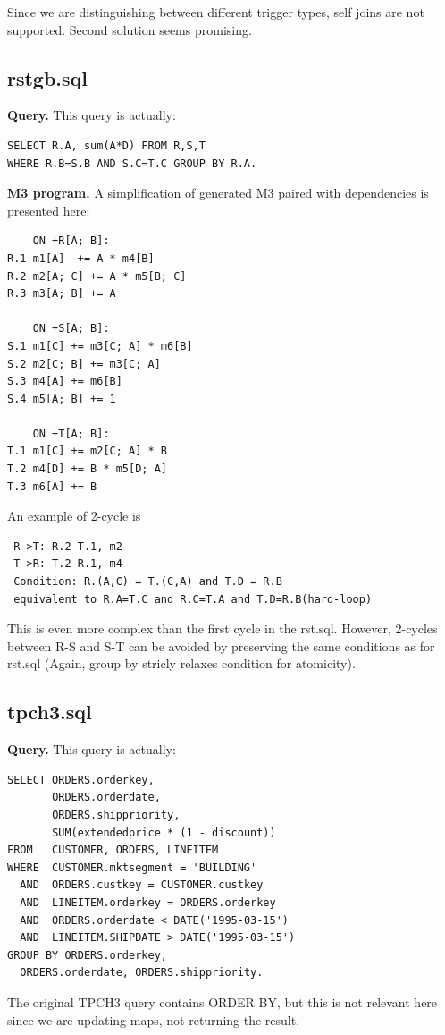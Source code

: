 \documentclass{sig-semester}
\begin{document}
Since we are distinguishing between different trigger types, self joins are not supported. Second solution seems promising.

\subsection{rstgb.sql}
\textbf{Query.} This query is actually:
\begin{verbatim}
SELECT R.A, sum(A*D) FROM R,S,T 
WHERE R.B=S.B AND S.C=T.C GROUP BY R.A.
\end{verbatim}

\textbf{M3 program.} A simplification of generated M3 paired with dependencies is presented here:
\begin{verbatim}
    ON +R[A; B]: 
R.1 m1[A]  += A * m4[B]
R.2 m2[A; C] += A * m5[B; C]
R.3 m3[A; B] += A

    ON +S[A; B]: 
S.1 m1[C] += m3[C; A] * m6[B]
S.2 m2[C; B] += m3[C; A]
S.3 m4[A] += m6[B]
S.4 m5[A; B] += 1

    ON +T[A; B]: 
T.1 m1[C] += m2[C; A] * B
T.2 m4[D] += B * m5[D; A]
T.3 m6[A] += B
\end{verbatim}

An example of 2-cycle is
\begin{verbatim}
 R->T: R.2 T.1, m2
 T->R: T.2 R.1, m4
 Condition: R.(A,C) = T.(C,A) and T.D = R.B 
 equivalent to R.A=T.C and R.C=T.A and T.D=R.B(hard-loop)
\end{verbatim}
This is even more complex than the first cycle in the rst.sql. However, 2-cycles between R-S and S-T can be avoided by preserving the same conditions as for rst.sql (Again, group by stricly relaxes condition for atomicity).

\subsection{tpch3.sql}
\textbf{Query.} This query is actually:

\begin{verbatim}
SELECT ORDERS.orderkey, 
       ORDERS.orderdate,
       ORDERS.shippriority,
       SUM(extendedprice * (1 - discount))
FROM   CUSTOMER, ORDERS, LINEITEM
WHERE  CUSTOMER.mktsegment = 'BUILDING'
  AND  ORDERS.custkey = CUSTOMER.custkey
  AND  LINEITEM.orderkey = ORDERS.orderkey
  AND  ORDERS.orderdate < DATE('1995-03-15')
  AND  LINEITEM.SHIPDATE > DATE('1995-03-15')
GROUP BY ORDERS.orderkey, 
  ORDERS.orderdate, ORDERS.shippriority.
\end{verbatim}
The original TPCH3 query contains ORDER BY, but this is not relevant here since we are updating maps, not returning the result.
\end{document}
